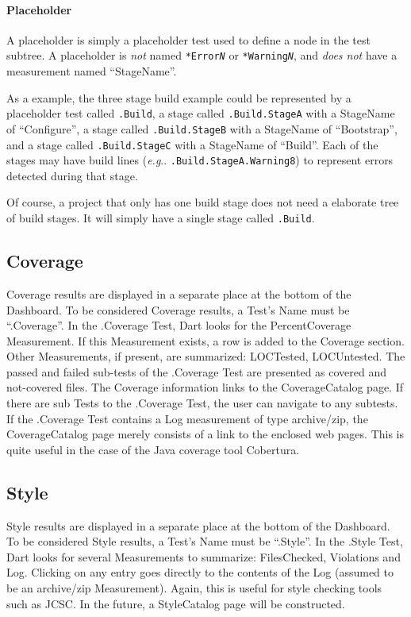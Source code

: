 \documentclass{InsightBook}
\makeatletter
\DeclareRobustCommand\onedot{\futurelet\@let@token\@onedot}
\def\@onedot{\ifx\@let@token.\else.\xspace\fi}
\def\eg{\emph{e.g}\onedot} \def\Eg{\emph{E.g}\onedot}
\makeatother
\begin{document}
\paragraph{Placeholder} A placeholder is simply a placeholder test
used to define a node in the test subtree. A placeholder is \emph{not}
named \texttt{*Error\emph{N}} or \texttt{*Warning\emph{N}}, and
\emph{does not} have a measurement named ``StageName''.

As a example, the three stage build example could be represented by a
placeholder test called \texttt{.Build}, a stage called
\texttt{.Build.StageA} with a StageName of ``Configure'', a stage
called \texttt{.Build.StageB} with a StageName of ``Bootstrap'', and a
stage called \texttt{.Build.StageC} with a StageName of ``Build''.
Each of the stages may have build lines (\eg
\texttt{.Build.StageA.Warning8}) to represent errors detected during
that stage.

Of course, a project that only has one build stage does not need a
elaborate tree of build stages. It will simply have a single stage
called \texttt{.Build}.

\subsection{Coverage}
Coverage results are displayed in a separate place at the bottom of
the Dashboard.  To be considered Coverage results, a Test's Name must
be ``.Coverage''.  In the .Coverage Test, Dart looks for the
PercentCoverage Measurement.  If this Measurement exists, a row is
added to the Coverage section.  Other Measurements, if present, are
summarized: LOCTested, LOCUntested.  The passed and failed sub-tests
of the .Coverage Test are presented as covered and not-covered files.
The Coverage information links to the CoverageCatalog page.  If there
are sub Tests to the .Coverage Test, the user can navigate to any
subtests.  If the .Coverage Test contains a Log measurement of type
archive/zip, the CoverageCatalog page merely consists of a link to the
enclosed web pages.  This is quite useful in the case of the Java
coverage tool Cobertura.

\subsection{Style}
Style results are displayed in a separate place at the bottom of
the Dashboard.  To be considered Style results, a Test's Name must
be ``.Style''.  In the .Style Test, Dart looks for several
Measurements to summarize: FilesChecked, Violations and Log.
Clicking on any entry goes directly to the contents of the Log
(assumed to be an archive/zip Measurement).  Again, this is useful for
style checking tools such as JCSC.  In the future, a StyleCatalog page
will be constructed.
\end{document}
